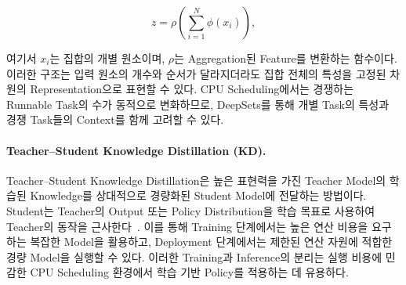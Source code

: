 \begin{equation}
    z = \rho \left( \sum_{i=1}^{N} \phi(x_i) \right),
\end{equation}

여기서 $x_i$는 집합의 개별 원소이며, $\rho$는
Aggregation된 Feature를 변환하는 함수이다.
이러한 구조는 입력 원소의 개수와 순서가 달라지더라도
집합 전체의 특성을 고정된 차원의 Representation으로
표현할 수 있다.
CPU Scheduling에서는 경쟁하는 Runnable Task의 수가
동적으로 변화하므로, DeepSets를 통해 개별 Task의
특성과 경쟁 Task들의 Context를 함께 고려할 수 있다.

\paragraph{Teacher--Student Knowledge Distillation (KD).}
Teacher--Student Knowledge Distillation은 높은 표현력을 가진 Teacher
Model의 학습된 Knowledge를 상대적으로 경량화된
Student Model에 전달하는 방법이다.
Student는 Teacher의 Output 또는 Policy Distribution을
학습 목표로 사용하여 Teacher의 동작을 근사한다~\cite{hinton2015,rusu2016}.
이를 통해 Training 단계에서는 높은 연산 비용을 요구하는
복잡한 Model을 활용하고, Deployment 단계에서는 제한된
연산 자원에 적합한 경량 Model을 실행할 수 있다.
이러한 Training과 Inference의 분리는 실행 비용에
민감한 CPU Scheduling 환경에서 학습 기반 Policy를
적용하는 데 유용하다.
